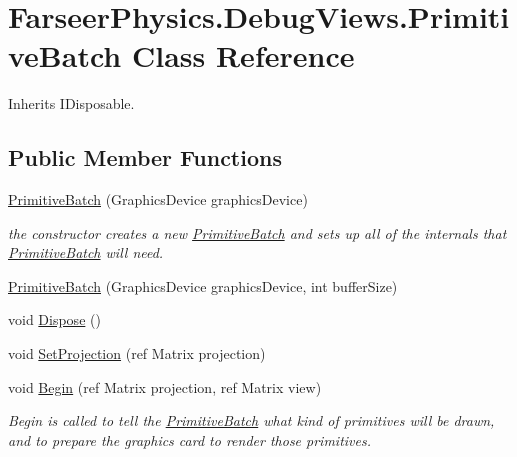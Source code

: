 \hypertarget{class_farseer_physics_1_1_debug_views_1_1_primitive_batch}{\section{Farseer\+Physics.\+Debug\+Views.\+Primitive\+Batch Class Reference}
\label{class_farseer_physics_1_1_debug_views_1_1_primitive_batch}
}


Inherits I\+Disposable.

\subsection*{Public Member Functions}
\begin{DoxyCompactItemize}
\item 
\hyperlink{class_farseer_physics_1_1_debug_views_1_1_primitive_batch_a425412b15b877115c068a12a8206d4a4}{Primitive\+Batch} (Graphics\+Device graphics\+Device)
\begin{DoxyCompactList}\small\item\em the constructor creates a new \hyperlink{class_farseer_physics_1_1_debug_views_1_1_primitive_batch}{Primitive\+Batch} and sets up all of the internals that \hyperlink{class_farseer_physics_1_1_debug_views_1_1_primitive_batch}{Primitive\+Batch} will need. \end{DoxyCompactList}\item 
\hyperlink{class_farseer_physics_1_1_debug_views_1_1_primitive_batch_a1e8f82174ac0e3046ecb55316c156c10}{Primitive\+Batch} (Graphics\+Device graphics\+Device, int buffer\+Size)
\item 
void \hyperlink{class_farseer_physics_1_1_debug_views_1_1_primitive_batch_ab148c1896130df8a071249df9b95c651}{Dispose} ()
\item 
void \hyperlink{class_farseer_physics_1_1_debug_views_1_1_primitive_batch_af86ed6ddf3343ff3a532d5ef6d4660d9}{Set\+Projection} (ref Matrix projection)
\item 
void \hyperlink{class_farseer_physics_1_1_debug_views_1_1_primitive_batch_a1527a16608db64e3886898e8f267997f}{Begin} (ref Matrix projection, ref Matrix view)
\begin{DoxyCompactList}\small\item\em Begin is called to tell the \hyperlink{class_farseer_physics_1_1_debug_views_1_1_primitive_batch}{Primitive\+Batch} what kind of primitives will be drawn, and to prepare the graphics card to render those primitives. \end{DoxyCompactList}\item 

\end{DoxyCompactItemize}
